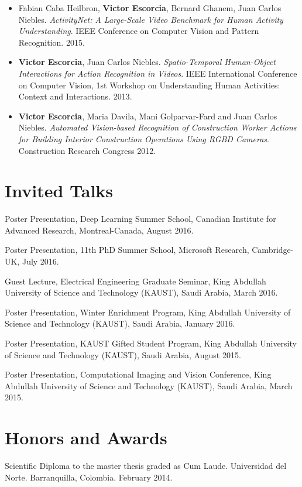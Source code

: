 \documentclass[margin]{res}
\begin{document}
\begin{resume}
\begin{itemize}
\item Fabian Caba Heilbron, \textbf{Victor Escorcia}, Bernard Ghanem, Juan Carlos
Niebles.
\textit{ActivityNet: A Large-Scale Video Benchmark for Human Activity
Understanding}.
IEEE Conference on Computer Vision and Pattern Recognition.
2015.
\smallskip

\item \textbf{Victor Escorcia}, Juan Carlos Niebles.
\textit{Spatio-Temporal Human-Object Interactions for Action Recognition
in Videos}.
IEEE International Conference on Computer Vision, 1st Workshop on
Understanding Human Activities: Context and Interactions. 2013.
\smallskip

\item \textbf{Victor Escorcia}, Maria Davila, Mani Golparvar-Fard and
Juan Carlos Niebles.
\textit{Automated Vision-based Recognition of Construction Worker
Actions for Building Interior Construction Operations Using RGBD Cameras}.
Construction Research Congress 2012.

\end{itemize}
               
\section{Invited Talks}
Poster Presentation, Deep Learning Summer School, Canadian Institute for Advanced Research, Montreal-Canada, August 2016.

Poster Presentation, 11th PhD Summer School, Microsoft Research, Cambridge-UK, July 2016.

Guest Lecture, Electrical Engineering Graduate Seminar, King Abdullah University of Science and Technology (KAUST), Saudi Arabia, March 2016.

Poster Presentation, Winter Enrichment Program, King Abdullah University of Science and Technology (KAUST), Saudi Arabia, January 2016.

Poster Presentation, KAUST Gifted Student Program, King Abdullah University of Science and Technology (KAUST), Saudi Arabia, August 2015.

Poster Presentation, Computational Imaging and Vision Conference, King Abdullah University of Science and Technology (KAUST), Saudi Arabia, March 2015.

\section{Honors and Awards}
Scientific Diploma to the master thesis graded as Cum Laude.
Universidad del Norte. Barranquilla, Colombia. February 2014.


\end{resume}
\end{document}
